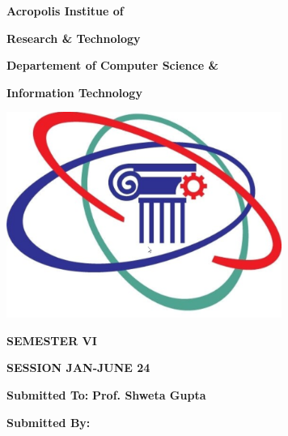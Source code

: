 \documentclass[12pt,,a4paper]{article}
\begin{document}
\thispagestyle{empty}
\vspace*{-3cm}

\begin{center}
\textbf{\fontsize{22}{\baselineskip}\selectfont Acropolis Institue of }

\bigskip

\textbf{\fontsize{22}{\baselineskip}\selectfont Research \& Technology}

\bigskip

\textbf{\fontsize{14}{\baselineskip}\selectfont Departement of Computer Science \& }

\bigskip

\textbf{\fontsize{14}{\baselineskip}\selectfont Information Technology }

\bigskip


\bigskip

\includegraphics[width=9cm]{logo-3.png}
\vspace*{1cm}
\bigskip

\textbf{\fontsize{20}{\baselineskip}\selectfont SEMESTER VI}

\bigskip

\textbf{\fontsize{20}{\baselineskip}\selectfont SESSION JAN-JUNE 24}

\bigskip

\bigskip

\bigskip


\bigskip


\end{center}

\begin{center}
\bigskip

\textbf{\fontsize{14}{\baselineskip}\selectfont Submitted To:} \hspace{\fill} \textbf{\fontsize{14}{\baselineskip}\selectfont Prof. Shweta Gupta}

\bigskip

\textbf{\fontsize{14}{\baselineskip}\selectfont Submitted By:}
\thispagestyle{empty}
\bigskip

\end{center}
\end{document}
